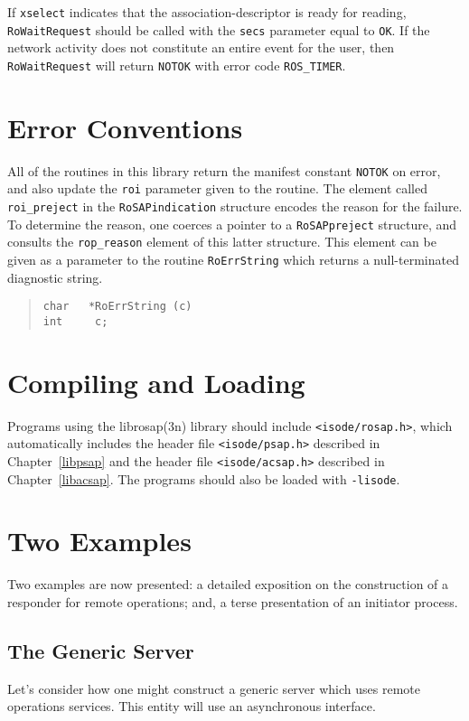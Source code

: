 If \verb"xselect" indicates that the association-descriptor is ready for
reading,
\verb"RoWaitRequest" should be called with the \verb"secs" parameter equal to
\verb"OK".
If the network activity does not constitute an entire event for the user,
then \verb"RoWaitRequest" will return \verb"NOTOK" with error code
\verb"ROS_TIMER".

\section       {Error Conventions}
All of the routines in this library return the manifest constant \verb"NOTOK"
on error,
and also update the \verb"roi" parameter given to the routine.
The element called \verb"roi_preject" in the \verb"RoSAPindication" structure
encodes the reason for the failure.
To determine the reason,
one coerces a pointer to a \verb"RoSAPpreject" structure,
and consults the \verb"rop_reason" element of this latter structure.
This element can be given as a
parameter to the routine \verb"RoErrString" which returns a null-terminated
diagnostic string.
\begin{quote}\small\begin{verbatim}
char   *RoErrString (c)
int     c;
\end{verbatim}\end{quote}

\section       {Compiling and Loading}
Programs using the \man librosap(3n) library should include
\verb"<isode/rosap.h>",
which automatically includes the header file \verb"<isode/psap.h>" described in
Chapter~\ref{libpsap} and the header file \verb"<isode/acsap.h>" described in
Chapter~\ref{libacsap}.
The programs should also be loaded with \verb"-lisode".

\section       {Two Examples}\label{ros:example}
Two examples are now presented:
a detailed exposition on the construction of a responder for remote operations;
and,
a terse presentation of an initiator process.

\subsection	{The Generic Server}\label{ros:example:server}
Let's consider how one might construct a generic server which uses remote
operations services.
This entity will use an asynchronous interface.

